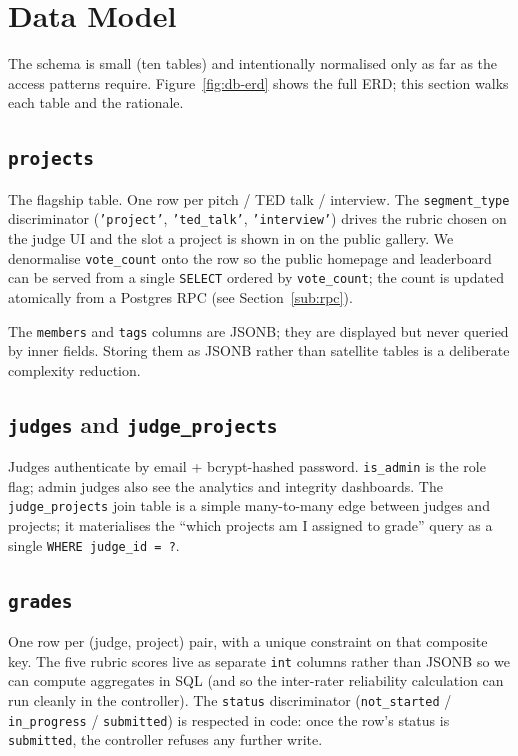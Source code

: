 \section{Data Model}
\label{sec:datamodel}

The schema is small (ten tables) and intentionally normalised only as far as
the access patterns require. Figure~\ref{fig:db-erd} shows the full ERD;
this section walks each table and the rationale.


\subsection{\texttt{projects}}

The flagship table. One row per pitch / TED talk / interview. The
\texttt{segment\_type} discriminator (\texttt{'project'},
\texttt{'ted\_talk'}, \texttt{'interview'}) drives the rubric chosen on the
judge UI and the slot a project is shown in on the public gallery. We
denormalise \texttt{vote\_count} onto the row so the public homepage and
leaderboard can be served from a single \texttt{SELECT} ordered by
\texttt{vote\_count}; the count is updated atomically from a Postgres RPC
(see Section~\ref{sub:rpc}).

The \texttt{members} and \texttt{tags} columns are JSONB; they are
displayed but never queried by inner fields. Storing them as JSONB rather
than satellite tables is a deliberate complexity reduction.

\subsection{\texttt{judges} and \texttt{judge\_projects}}

Judges authenticate by email + bcrypt-hashed password. \texttt{is\_admin}
is the role flag; admin judges also see the analytics and integrity
dashboards. The \texttt{judge\_projects} join table is a simple
many-to-many edge between judges and projects; it materialises the
``which projects am I assigned to grade'' query as a single
\texttt{WHERE judge\_id = ?}.

\subsection{\texttt{grades}}

One row per (judge, project) pair, with a unique constraint on that
composite key. The five rubric scores live as separate
\texttt{int} columns rather than JSONB so we can compute aggregates in
SQL (and so the inter-rater reliability calculation can run cleanly in
the controller). The \texttt{status} discriminator
(\texttt{not\_started} / \texttt{in\_progress} / \texttt{submitted}) is
respected in code: once the row's status is \texttt{submitted}, the
controller refuses any further write.


